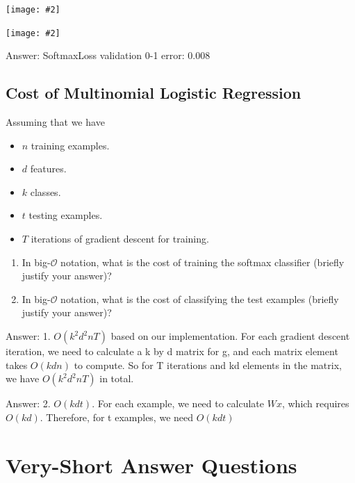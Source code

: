 \documentclass{article}
\def\ans#1{\par\gre{Answer: #1}}
\def\blu#1{{\color{blu}#1}}
\def\gre#1{{\color{gre}#1}}
\newcommand{\centerfig}[2]{\begin{center}\texttt{[image: \#2]}\end{center}}
\def\items#1{\begin{itemize}#1\end{itemize}}
\def\enum#1{\begin{enumerate}#1\end{enumerate}}
\begin{document}
\centerfig{0.8}{q3.3-code1}
\centerfig{0.8}{q3.3-code2}
\ans{SoftmaxLoss validation 0-1 error: 0.008}

\pagebreak

\subsection{Cost of Multinomial Logistic Regression}

Assuming that we have
\items{
\item $n$ training examples.
\item $d$ features.
\item $k$ classes.
\item $t$ testing examples.
\item $T$ iterations of gradient descent for training.
}
\blu{\enum{
\item In big-$\mathcal{O}$ notation, what is the cost of training the softmax classifier (briefly justify your answer)?
\item In big-$\mathcal{O}$ notation, what is the cost of classifying the test examples (briefly justify your answer)?
}}

\ans{1. $O(k^2d^2nT)$ based on our implementation. For each gradient descent iteration, we need to calculate a k by d matrix for g, and each matrix element takes $O(kdn)$ to compute. So for T iterations and kd elements in the matrix, we have $O(k^2d^2nT)$ in total.}

\ans{2. $O(kdt)$. For each example, we need to calculate $Wx$, which requires $O(kd)$. Therefore, for t examples, we need $O(kdt)$
}


\pagebreak

\section{Very-Short Answer Questions}
\end{document}
